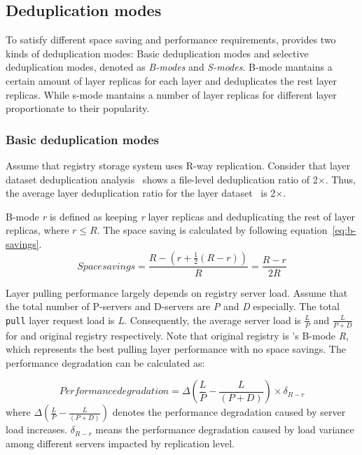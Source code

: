 \subsection{Deduplication modes}
\label{sec:dedup-mode}

To satisfy different space saving and performance requirements,
\sysname provides two kinds of deduplication modes:
Basic deduplication modes and selective deduplication modes, denoted as \emph{B-modes} and \emph{S-modes}.
B-mode mantains a certain amount of layer replicas for each layer and deduplicates the rest layer replicas.
While s-mode mantains a number of layer replicas for different layer proportionate to their popularity.

\subsubsection{Basic deduplication modes}
Assume that registry storage system uses R-way replication.
Consider that layer dataset deduplication analysis~\cite{xxx} shows a file-level deduplication ratio of 2$\times$.
Thus, the average layer deduplication ratio for the layer dataset~\cite{xxx} is 2$\times$.

B-mode \emph{r} is defined as keeping \emph{r} layer replicas and deduplicating the rest of layer replicas, where $r \leq R$. 
The space saving is calculated by following equation~\ref{eq:b-savings}.
\begin{equation}\label{eq:b-savings}
Space savings = \frac{R-(r+\frac{1}{2}(R-r))}{R} = \frac{R-r}{2R}
\end{equation}

Layer pulling performance largely depends on registry server load.
Assume that the total number of P-servers and D-servers are \emph{P} and \emph{D} especially.
The total \texttt{pull} layer request load is \emph{L}.
Consequently, the average server load is $\frac{L}{P}$ and $\frac{L}{P+D}$ for \sysname and original registry respectively.
Note that original registry is \sysname's B-mode \emph{R}, which represents the best pulling layer performance with no space savings.
The performance degradation can be calculated as:
 
 \begin{equation}\label{eq:c-pull}
Performance degradation =  \Delta(\frac{L}{P} - \frac{L}{(P+D)})\times \delta_{R-r}
 \end{equation}
 where $\Delta(\frac{L}{P} - \frac{L}{(P+D)})$ denotes the performance degradation caused by server load increases.
 $\delta_{R-r}$ means the performance degradation caused by load variance among different servers impacted by replication level.

